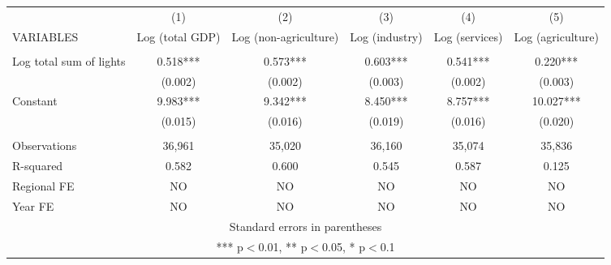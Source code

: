 \documentclass[]{article}
\begin{document}
\begin{tabular}{lccccc} \hline
 & (1) & (2) & (3) & (4) & (5) \\
VARIABLES & Log (total GDP) & Log (non-agriculture) & Log (industry) & Log (services) & Log (agriculture) \\ \hline
 &  &  &  &  &  \\
Log total sum of lights & 0.518*** & 0.573*** & 0.603*** & 0.541*** & 0.220*** \\
 & (0.002) & (0.002) & (0.003) & (0.002) & (0.003) \\
Constant & 9.983*** & 9.342*** & 8.450*** & 8.757*** & 10.027*** \\
 & (0.015) & (0.016) & (0.019) & (0.016) & (0.020) \\
 &  &  &  &  &  \\
Observations & 36,961 & 35,020 & 36,160 & 35,074 & 35,836 \\
R-squared & 0.582 & 0.600 & 0.545 & 0.587 & 0.125 \\
Regional FE & NO & NO & NO & NO & NO \\
 Year FE & NO & NO & NO & NO & NO \\ \hline
\multicolumn{6}{c}{ Standard errors in parentheses} \\
\multicolumn{6}{c}{ *** p$<$0.01, ** p$<$0.05, * p$<$0.1} \\
\end{tabular}
\end{document}
